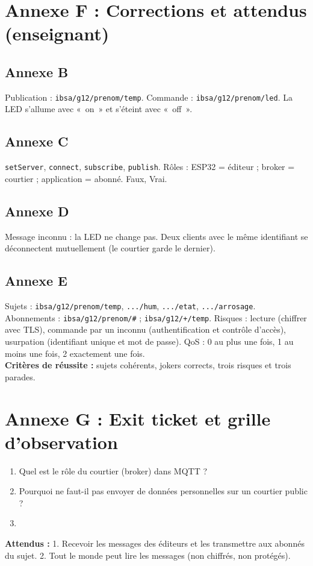 \documentclass[11pt,a4paper]{article}
\begin{document}
\newpage
\section*{Annexe F : Corrections et attendus (enseignant)}

\subsection*{Annexe B}
Publication : \texttt{ibsa/g12/prenom/temp}. Commande : \texttt{ibsa/g12/prenom/led}. La LED s'allume avec «~on~» et s'éteint avec «~off~».

\subsection*{Annexe C}
\texttt{setServer}, \texttt{connect}, \texttt{subscribe}, \texttt{publish}. Rôles : ESP32 = éditeur ; broker = courtier ; application = abonné. Faux, Vrai.

\subsection*{Annexe D}
Message inconnu : la LED ne change pas. Deux clients avec le même identifiant se déconnectent mutuellement (le courtier garde le dernier).

\subsection*{Annexe E}
Sujets : \texttt{ibsa/g12/prenom/temp}, \texttt{.../hum}, \texttt{.../etat}, \texttt{.../arrosage}. Abonnements : \texttt{ibsa/g12/prenom/\#} ; \texttt{ibsa/g12/+/temp}. Risques : lecture (chiffrer avec TLS), commande par un inconnu (authentification et contrôle d'accès), usurpation (identifiant unique et mot de passe). QoS : 0 au plus une fois, 1 au moins une fois, 2 exactement une fois.\\
\textbf{Critères de réussite :} sujets cohérents, jokers corrects, trois risques et trois parades.

\newpage
\section*{Annexe G : Exit ticket et grille d'observation}

\begin{enumerate}
 \item Quel est le rôle du courtier (broker) dans MQTT ?\\ \lig
 \item Pourquoi ne faut-il pas envoyer de données personnelles sur un courtier public ?\\ \lig
 \item \autoeval
\end{enumerate}
\textbf{Attendus :} 1. Recevoir les messages des éditeurs et les transmettre aux abonnés du sujet. 2. Tout le monde peut lire les messages (non chiffrés, non protégés).

\bigskip
{}
\end{document}
